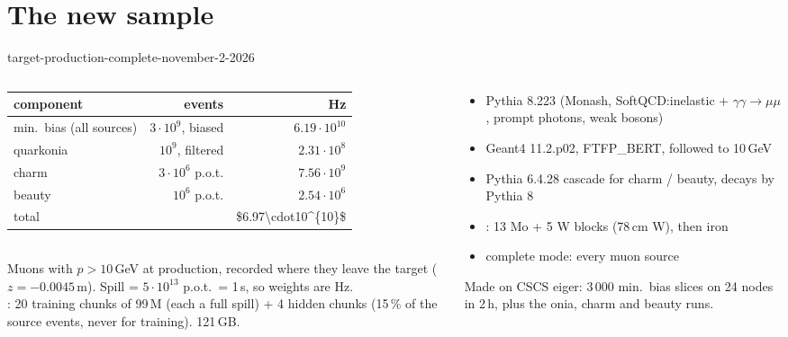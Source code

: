 \documentclass[aspectratio=169,10pt]{beamer}
\begin{document}
\section{The new sample}

\begin{frame}{target-production-complete-november-2-2026}
  \begin{columns}[c]
    \begin{column}{0.54\textwidth}\footnotesize
      \begin{tabular}{@{}lrr@{}}
        \toprule
        component & events & Hz\\
        \midrule
        min.\ bias (all sources) & $3\cdot10^9$, biased & $6.19\cdot10^{10}$\\
        quarkonia & $10^9$, filtered & $2.31\cdot10^{8}$\\
        charm & $3\cdot10^6$ p.o.t. & $7.56\cdot10^{9}$\\
        beauty & $10^6$ p.o.t. & $2.54\cdot10^{6}$\\
        \midrule
        total & & \num{$6.97\cdot10^{10}$}\\
        \bottomrule
      \end{tabular}\\[2mm]
      Muons with $p>10$\,GeV at production, recorded where they leave the target ($z=-0.0045$\,m). Spill = $5\cdot10^{13}$ p.o.t.\ = 1\,s, so weights are Hz.\\[1.5mm]
      : 20 training chunks of 99\,M (each a full spill) + 4 hidden chunks (15\,\% of the source events, never for training). 121\,GB.
    \end{column}
    \begin{column}{0.42\textwidth}\footnotesize
      \begin{itemize}\footnotesize
        \item Pythia 8.223 (Monash, SoftQCD:inelastic + $\gamma\gamma\to\mu\mu$, prompt photons, weak bosons)
        \item Geant4 11.2.p02, FTFP\_BERT, followed to 10\,GeV
        \item Pythia 6.4.28 cascade for charm / beauty, decays by Pythia 8
        \item {}: 13 Mo + 5 W blocks (78\,cm W), then iron
        \item complete mode: every muon source
      \end{itemize}
      Made on CSCS eiger: 3\,000 min.\ bias slices on 24 nodes in 2\,h, plus the onia, charm and beauty runs.\\[1mm]
    \end{column}
  \end{columns}
\end{frame}
\end{document}
